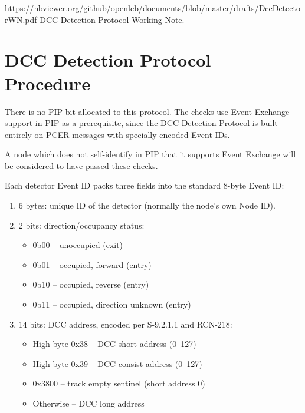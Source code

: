 



\maketitle
\thispagestyle{firststyle}

\introductionCaveats
    {https://nbviewer.org/github/openlcb/documents/blob/master/drafts/DccDetectorWN.pdf}
    {DCC Detection Protocol Working Note}.

\section{DCC Detection Protocol Procedure}


There is no PIP bit allocated to this protocol.  The checks use Event
Exchange support in PIP as a prerequisite, since the DCC Detection Protocol
is built entirely on PCER messages with specially encoded Event IDs.

A node which does not self-identify in PIP that it supports
Event Exchange will be considered to have passed these checks.
\pipsetFootnote

Each detector Event ID packs three fields into the standard 8-byte Event ID:

\begin{enumerate}
\item 6 bytes: unique ID of the detector (normally the node's own Node ID).
\item 2 bits: direction/occupancy status:
    \begin{itemize}
    \item 0b00 -- unoccupied (exit)
    \item 0b01 -- occupied, forward (entry)
    \item 0b10 -- occupied, reverse (entry)
    \item 0b11 -- occupied, direction unknown (entry)
    \end{itemize}
\item 14 bits: DCC address, encoded per S-9.2.1.1 and RCN-218:
    \begin{itemize}
    \item High byte 0x38 -- DCC short address (0--127)
    \item High byte 0x39 -- DCC consist address (0--127)
    \item 0x3800 -- track empty sentinel (short address 0)
    \item Otherwise -- DCC long address
    \end{itemize}
\end{enumerate}

